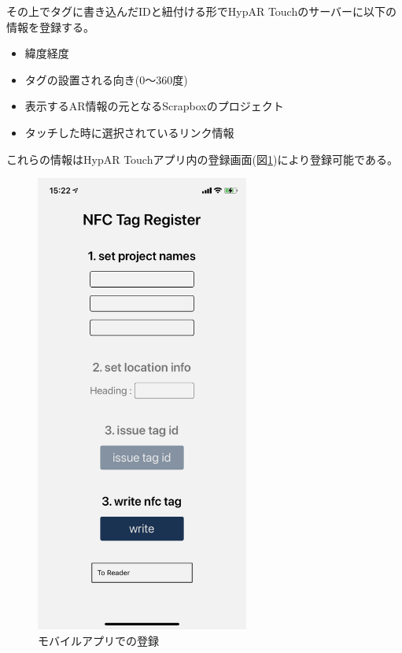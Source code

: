 その上でタグに書き込んだIDと紐付ける形でHypAR Touchのサーバーに以下の情報を登録する。
\begin{itemize}
  \item 緯度経度
  \item タグの設置される向き(0〜360度)
  \item 表示するAR情報の元となるScrapboxのプロジェクト
  \item タッチした時に選択されているリンク情報
\end{itemize}
これらの情報はHypAR Touchアプリ内の登録画面(図\ref{fig:nfc_register_mobile})により登録可能である。

\begin{figure}[h]
  \centering
  \includegraphics[width=70mm]{images/nfc_register_mobile.png}
  \caption{モバイルアプリでの登録} \label{fig:nfc_register_mobile}
\end{figure}